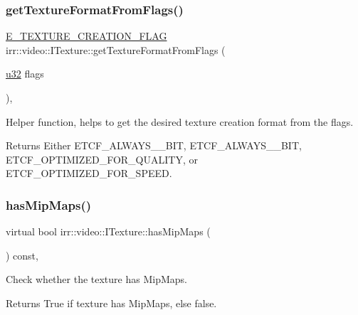 \subsubsection{\texorpdfstring{get\+Texture\+Format\+From\+Flags()}{getTextureFormatFromFlags()}}
{\footnotesize\ttfamily \hyperlink{namespaceirr_1_1video_acaf6f7414534f7d62bff18c5bf11876f}{E\+\_\+\+T\+E\+X\+T\+U\+R\+E\+\_\+\+C\+R\+E\+A\+T\+I\+O\+N\+\_\+\+F\+L\+AG} irr\+::video\+::\+I\+Texture\+::get\+Texture\+Format\+From\+Flags (\begin{DoxyParamCaption}\item[{\hyperlink{namespaceirr_a0416a53257075833e7002efd0a18e804}{u32}}]{flags }\end{DoxyParamCaption})\hspace{0.3cm}{\ttfamily [inline]}, {\ttfamily [protected]}}



Helper function, helps to get the desired texture creation format from the flags. 

\begin{DoxyReturn}{Returns}
Either E\+T\+C\+F\+\_\+\+A\+L\+W\+A\+Y\+S\+\_\+\_\+\+B\+IT, E\+T\+C\+F\+\_\+\+A\+L\+W\+A\+Y\+S\+\_\+\_\+\+B\+IT, E\+T\+C\+F\+\_\+\+O\+P\+T\+I\+M\+I\+Z\+E\+D\+\_\+\+F\+O\+R\+\_\+\+Q\+U\+A\+L\+I\+TY, or E\+T\+C\+F\+\_\+\+O\+P\+T\+I\+M\+I\+Z\+E\+D\+\_\+\+F\+O\+R\+\_\+\+S\+P\+E\+ED. 
\end{DoxyReturn}
\mbox{\label{classirr_1_1video_1_1ITexture_a9da815ed3b2a3efec45f957c6918fbba}} 
\subsubsection{\texorpdfstring{has\+Mip\+Maps()}{hasMipMaps()}}
{\footnotesize\ttfamily virtual bool irr\+::video\+::\+I\+Texture\+::has\+Mip\+Maps (\begin{DoxyParamCaption}{ }\end{DoxyParamCaption}) const\hspace{0.3cm}{\ttfamily [inline]}, {\ttfamily [virtual]}}



Check whether the texture has Mip\+Maps. 

\begin{DoxyReturn}{Returns}
True if texture has Mip\+Maps, else false. 
\end{DoxyReturn}
\mbox{\label{classirr_1_1video_1_1ITexture_aac5c0e281e1aa49365fdb7e7fa4d7342}} 
